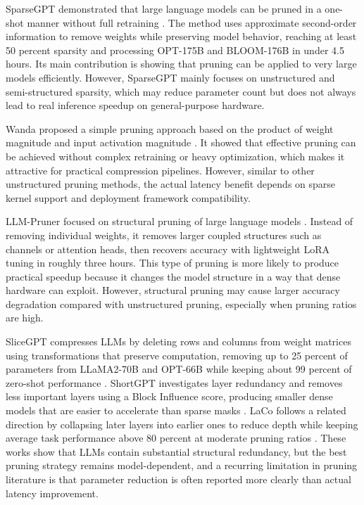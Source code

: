 \documentclass[
11pt, %
english, %
singlespacing, %
headsepline, %
]{MastersDoctoralThesis} %
\begin{document}
SparseGPT demonstrated that large language models can be pruned in a one-shot manner without full retraining \cite{frantar2023sparsegpt}. The method uses approximate second-order information to remove weights while preserving model behavior, reaching at least 50 percent sparsity and processing OPT-175B and BLOOM-176B in under 4.5 hours. Its main contribution is showing that pruning can be applied to very large models efficiently. However, SparseGPT mainly focuses on unstructured and semi-structured sparsity, which may reduce parameter count but does not always lead to real inference speedup on general-purpose hardware.

Wanda proposed a simple pruning approach based on the product of weight magnitude and input activation magnitude \cite{sun2024wanda}. It showed that effective pruning can be achieved without complex retraining or heavy optimization, which makes it attractive for practical compression pipelines. However, similar to other unstructured pruning methods, the actual latency benefit depends on sparse kernel support and deployment framework compatibility.

LLM-Pruner focused on structural pruning of large language models \cite{ma2023llmpruner}. Instead of removing individual weights, it removes larger coupled structures such as channels or attention heads, then recovers accuracy with lightweight LoRA tuning in roughly three hours. This type of pruning is more likely to produce practical speedup because it changes the model structure in a way that dense hardware can exploit. However, structural pruning may cause larger accuracy degradation compared with unstructured pruning, especially when pruning ratios are high.

SliceGPT compresses LLMs by deleting rows and columns from weight matrices using transformations that preserve computation, removing up to 25 percent of parameters from LLaMA2-70B and OPT-66B while keeping about 99 percent of zero-shot performance \cite{ashkboos2024slicegpt}. ShortGPT investigates layer redundancy and removes less important layers using a Block Influence score, producing smaller dense models that are easier to accelerate than sparse masks \cite{men2024shortgpt}. LaCo follows a related direction by collapsing later layers into earlier ones to reduce depth while keeping average task performance above 80 percent at moderate pruning ratios \cite{yang2024laco}. These works show that LLMs contain substantial structural redundancy, but the best pruning strategy remains model-dependent, and a recurring limitation in pruning literature is that parameter reduction is often reported more clearly than actual latency improvement.
\end{document}
